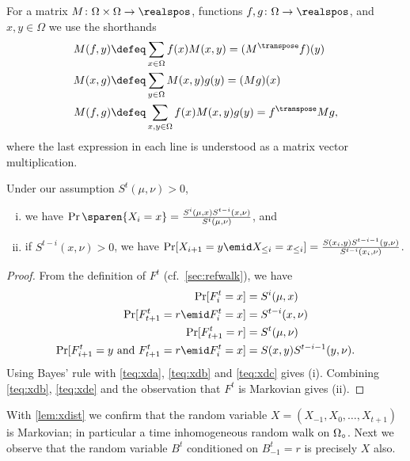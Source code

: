 For a matrix $M\colon\Omega\times \Omega\to\realspos$,
functions $f,g\colon\Omega\to\realspos$, and $x,y\in \Omega$
we use the shorthands
\begin{align*}
M(f,y)&\defeq \sum_{x\in\Omega} f(x)M(x,y) = (M^\transpose f)(y)\\
M(x,g)&\defeq \sum_{y\in\Omega} M(x,y)g(y) = (Mg)(x)\\
M(f,g)&\defeq \sum_{x,y\in\Omega} f(x)M(x,y)g(y) 
    = f^\transpose M g,
\end{align*}
where the last expression in each line is understood as
a matrix vector multiplication.
\begin{lemma}
\label{lem:xdist}
Under our assumption $S^t(\mu, \nu) > 0$,
\begin{enumerate}[(i)]
\item we have
  $\Pr\sparen{X_i = x} 
      = \frac{S^i(\mu,x)S^{t-i}(x,\nu)}{S^t(\mu,\nu)}$, and
%
\item if $S^{t-i}(x,\nu)>0$, 
    we have $\Pr[X_{i+1}=y \emid X_{\le i} = x_{\le i}]
    =\frac{S(x_i,y)S^{t-i-1}(y,\nu)}{S^{t-i}(x_i,\nu)}$.
\end{enumerate}
\end{lemma}
\begin{proof}
From the definition of $F^t$ (cf.\ \autoref{sec:refwalk}), 
we have 
  \begin{align}
    \Pr[F^t_i =x] &= S^i(\mu, x)\label{teq:xda}\\
    \Pr[F^t_{t+1}=r\emid F^t_{i}=x] 
        &= S^{t-i}(x,\nu)\label{teq:xdb}\\
    \Pr[F^t_{t+1}=r] &= S^t(\mu,\nu)\label{teq:xdc}\\
    \Pr[F^{t}_{i+1}=y\text{ and }F^t_{t+1}=r\emid 
        F^{t}_i =  x] &= S(x,y)S^{t-i-1}(y,\nu)\label{teq:xde}.
  \end{align}
Using Bayes' rule with \autoref{teq:xda},
\eqref{teq:xdb} and \eqref{teq:xdc} gives (i).
Combining \autoref{teq:xdb}, \eqref{teq:xde}
and the observation that $F^t$ is Markovian
gives (ii).
\end{proof}

With \autoref{lem:xdist} we confirm that the random variable $X=(X_{-1},X_0,\ldots,X_{t+1})$ is Markovian; 
in particular a time inhomogeneous random walk on $\Omega_\circ$.
Next we observe that the random variable $B^t$ conditioned
on $B^t_{-1}=r$ is precisely $X$ also.

